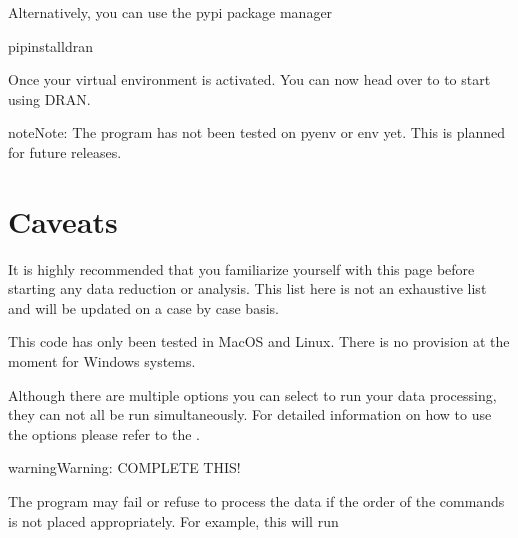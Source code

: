 \documentclass[letterpaper,10pt,english]{sphinxmanual}
\begin{document}
\sphinxAtStartPar
Alternatively, you can use the pypi package manager

\begin{sphinxVerbatim}[commandchars=\\\{\}]
\PYGZdl{}pipinstalldran
\end{sphinxVerbatim}

\sphinxAtStartPar
Once your virtual environment is activated. You can now head over
to {\hyperref[\detokenize{extras/tuts/tutorials::doc}]{}} to start using DRAN.

\begin{sphinxadmonition}{note}{Note:}
\sphinxAtStartPar
The program has not been tested on pyenv or env yet. This is planned for future releases.
\end{sphinxadmonition}

\sphinxstepscope


\section{Caveats}
\label{\detokenize{extras/caveats:caveats}}\label{\detokenize{extras/caveats::doc}}
\sphinxAtStartPar
It is highly recommended that you familiarize yourself with
this page before starting any data reduction or analysis. This list here
is not an exhaustive list and will be updated on a case by case basis.

\sphinxAtStartPar
{}

\sphinxAtStartPar
This code has only been tested in MacOS and Linux. There is no provision
at the moment for Windows systems.

\sphinxAtStartPar
{}

\sphinxAtStartPar
Although there are multiple options you can select to run your data processing,
they can not all be run simultaneously. For detailed information on how to
use the options please refer to the  .

\sphinxAtStartPar
{}

\begin{sphinxadmonition}{warning}{Warning:}
\sphinxAtStartPar
COMPLETE THIS!
\end{sphinxadmonition}

\sphinxAtStartPar
The program may fail or refuse to process the data if the order of the commands
is not placed appropriately. For example, this will run
\end{document}
